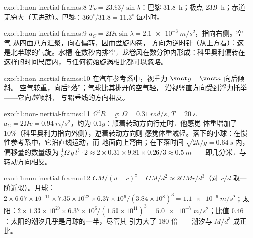 \begin{solution}{exo:b1:non-inertial-frames:8}
$T_F = 23.93/\sin\lambda$：巴黎 \qty{31.8}{h}；极点 \qty{23.9}{h}；赤道
无穷大（无进动）。巴黎：$360^\circ/31.8 = 11.3^\circ$ 每小时。
\end{solution}

\begin{solution}{exo:b1:non-inertial-frames:9}
$a_C = 2\Omega v\sin\lambda = \qty{2.1e-3}{m/s^2}$，指向右侧。空气
从四面八方汇聚，向右偏转，因而盘旋内卷，
方向为逆时针（从上方看）：这是北半球的气旋。水槽
在数秒内排空，龙卷风在数分钟内形成：科里奥利偏转在
这样的时间尺度内，与任何初始旋涡相比都可以忽略。
\end{solution}

\begin{solution}{exo:b1:non-inertial-frames:10}
在汽车参考系中，视重力 $\vect g - \vect a$ 向后倾斜。
空气较重，向后“落”；气球比其排开的空气轻，
沿视竖直方向受到浮力托举——它向\emph{前}倾斜，
与铅垂线的方向相反。
\end{solution}

\begin{solution}{exo:b1:non-inertial-frames:11}
$\Omega^2R = g$: $\Omega = \qty{0.31}{rad/s}$, $T = \qty{20}{s}$. $a_C = 2\Omega v
= \qty{0.94}{m/s^2}$，约为 $0.1g$：顺着转动方向行走时，他感觉
体重增加了 $10\%$（科里奥利力指向外侧），逆着转动方向则
感觉体重减轻。落下的小球：在惯性参考系中，它沿直线运动，而
地面向上弯曲；在下落时间 $\sqrt{2h/g} = \qty{0.64}{s}$ 内，
偏移量的数量级为 $\tfrac13\Omega\,g\,t^3 \cdot 2 \approx 2 \times 0.31 \times
9.81 \times 0.26/3 \approx \qty{0.5}{m}$——即几分米，与
转动方向相反。
\end{solution}

\begin{solution}{exo:b1:non-inertial-frames:12}
$GM/(d - r)^2 - GM/d^2 \approx 2GMr/d^3$（对 $r/d$ 取一阶近似）。月球：
$2 \times 6.67\times10^{-11} \times 7.35\times10^{22} \times 6.37\times10^6/
(3.84\times10^8)^3 = \qty{1.1e-6}{m/s^2}$；太阳：$2 \times 1.33\times10^{20}
\times 6.37\times10^6/(1.50\times10^{11})^3 = \qty{5.0e-7}{m/s^2}$；比值
$0.46$：太阳的潮汐几乎是月球的一半，尽管其
引力大了 $180$ 倍——潮汐与 $M/d^3$ 成正比。
\end{solution}

